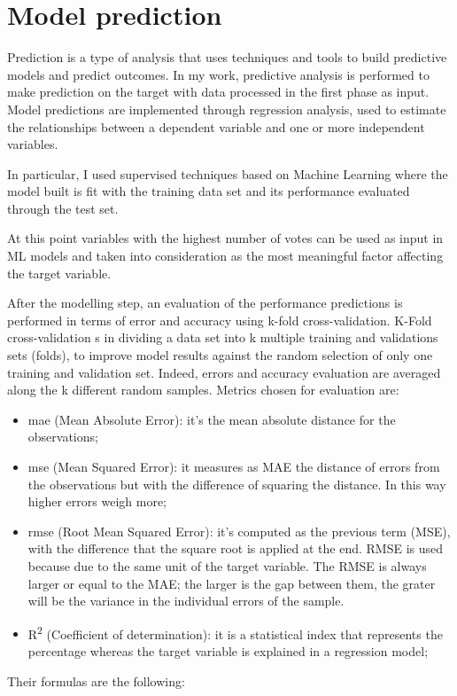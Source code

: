 \section{Model prediction}
Prediction is a type of analysis that uses techniques and tools to build predictive models and predict outcomes. 
In my work, predictive analysis is performed to make prediction on the target with data processed in the first phase as input.\newline
Model predictions are implemented through regression analysis, used to estimate the relationships between a dependent variable and one or more independent variables.\par
In particular, I used supervised techniques based on Machine Learning where the model built is fit with the training data set and its performance evaluated through the test set. 
\par
At this point variables with the highest number of votes can be used as input in ML models and taken into consideration as the most meaningful factor affecting the target variable.
\par
After the modelling step, an evaluation of the performance predictions is performed in terms of error and accuracy using k-fold cross-validation.\newline
K-Fold cross-validation s in dividing a data set into k multiple training and validations sets (folds), to improve model results against the random selection of only one training and validation set. Indeed, errors and accuracy evaluation are averaged along the k different random samples.
Metrics chosen for evaluation are:
\begin{itemize}
    \item \acrshort{mae} (Mean Absolute Error): it's the mean absolute distance for the observations;
    \item \acrshort{mse} (Mean Squared Error): it measures as MAE the distance of errors from the observations but with the difference of squaring the distance. In this way higher errors weigh more;
    \item \acrshort{rmse} (Root Mean Squared Error): it's computed as the previous term (MSE), with the difference that the square root is applied at the end. RMSE is used because due to the same unit of the target variable.
    The RMSE is always larger or equal to the MAE; the larger is the gap between them, the grater will be the variance in the individual errors of the sample.
    \item R\textsuperscript{2} (Coefficient of determination): it is a statistical index that represents the percentage whereas the target variable is explained in a regression model;
\end{itemize} 
Their formulas are the following:
